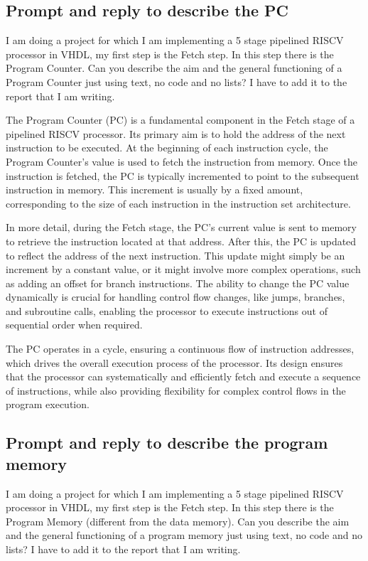 \documentclass{article}
\begin{document}
\subsection{Prompt and reply to describe the PC}\label{prompt:pc}
\begin{itshape}
    I am doing a project for which I am implementing a 5 stage pipelined RISCV processor in VHDL, my first step is the Fetch step. 
    In this step there is the Program Counter. 
    Can you describe the aim and the general functioning of a Program Counter just using text, no code and no lists? 
    I have to add it to the report that I am writing.
\end{itshape}

\begin{spverbatim}
The Program Counter (PC) is a fundamental component in the Fetch 
stage of a pipelined RISCV processor. 
Its primary aim is to hold the address of the next instruction to be executed. 
At the beginning of each instruction cycle, the Program Counter's value is used 
to fetch the instruction from memory. 
Once the instruction is fetched, the PC is typically incremented to point 
to the subsequent instruction in memory. 
This increment is usually by a fixed amount, 
corresponding to the size of each instruction 
in the instruction set architecture.

In more detail, during the Fetch stage, the PC's current value is sent to memory 
to retrieve the instruction located at that address. 
After this, the PC is updated to reflect the address of the next instruction. 
This update might simply be an increment by a constant value, 
or it might involve more complex operations, 
such as adding an offset for branch instructions. 
The ability to change the PC value dynamically 
is crucial for handling control flow changes, 
like jumps, branches, and subroutine calls, 
enabling the processor to execute instructions 
out of sequential order when required.

The PC operates in a cycle, ensuring a continuous flow of instruction addresses, 
which drives the overall execution process of the processor. 
Its design ensures that the processor can systematically and efficiently 
fetch and execute a sequence of instructions, 
while also providing flexibility for complex control 
flows in the program execution.
\end{spverbatim}


\subsection{Prompt and reply to describe the program memory}\label{prompt:pmem}
\begin{itshape}
I am doing a project for which I am implementing a 5 stage pipelined RISCV processor in VHDL, my
first step is the Fetch step. In this step there is the Program Memory (different from the data memory). 
Can you describe the aim and the general functioning of a program memory just using text, 
no code and no lists? I have to add it to the report that I am writing.
\end{itshape}
\end{document}
